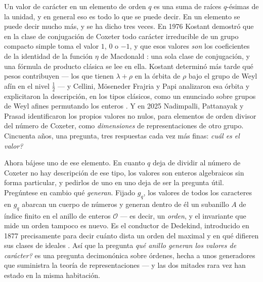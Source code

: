 \documentclass[11pt,a4paper]{article}
\theoremstyle{definition}
\newcommand{\cO}{\mathcal{O}}
\begin{document}
Un valor de car\'acter en un elemento de orden $q$ es una suma de ra\'ices $q$-\'esimas de la
unidad, y en general eso es todo lo que se puede decir. En un elemento se puede decir mucho m\'as,
y se ha dicho tres veces. En 1976 Kostant demostr\'o que en la clase de conjugaci\'on de Coxeter
todo car\'acter irreducible de un grupo compacto simple toma el valor $1$, $0$ o $-1$, y que esos
valores \emph{son} los coeficientes de la identidad de la funci\'on $\eta$ de Macdonald
\cite[Thm.~3.1]{Kostant76}: una sola clase de conjugaci\'on, y una f\'ormula de producto cl\'asica
se lee en ella. Kostant determin\'o m\'as tarde qu\'e pesos contribuyen --- los que tienen
$\lambda+\rho$ en la \'orbita de $\rho$ bajo el grupo de Weyl af\'in en el nivel $\tfrac12$
\cite{Kostant04} --- y Cellini, M\"oseneder Frajria y Papi analizaron esa \'orbita y explicitaron
la descripci\'on, en los tipos cl\'asicos, como un enunciado sobre grupos de Weyl afines
permutando los enteros \cite{CMP}. Y en 2025 Nadimpalli, Pattanayak y Prasad \cite{NPP}
identificaron los propios valores no nulos, para elementos de orden divisor del n\'umero de
Coxeter, como \emph{dimensiones} de representaciones de otro grupo. Cincuenta a\~nos, una pregunta,
tres respuestas cada vez m\'as finas: \emph{\textquestiondown cu\'al es el valor?}

Ahora b\'ajese uno de ese elemento. En cuanto $q$ deja de dividir al n\'umero de Coxeter no hay
descripci\'on de ese tipo, los valores son enteros algebraicos sin forma particular, y pedirlos de
uno en uno deja de ser la pregunta \'util. Preg\'untese en cambio qu\'e \emph{generan}. Fijado
$g_q$, los valores de todos los caracteres en $g_q$ abarcan un cuerpo de n\'umeros y generan dentro
de \'el un subanillo $A$ de \'indice finito en el anillo de enteros $\cO$ --- es decir, un
\emph{orden}, y el invariante que mide un orden tampoco es nuevo. Es el conductor de Dedekind,
introducido en 1877 precisamente para decir cu\'anto dista un orden del maximal y en qu\'e
difieren sus clases de ideales \cite{Ded77}. As\'i que la pregunta \emph{\textquestiondown qu\'e
anillo generan los valores de car\'acter?} es una pregunta decimon\'onica sobre \'ordenes, hecha a
unos generadores que suministra la teor\'ia de representaciones --- y las dos mitades rara vez han
estado en la misma habitaci\'on.
\end{document}
